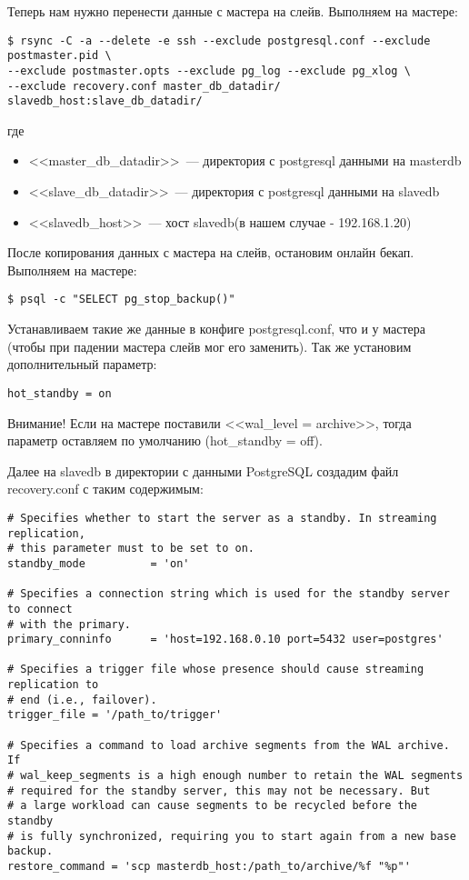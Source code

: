 Теперь нам нужно перенести данные с мастера на слейв. Выполняем на мастере:
\begin{lstlisting}[label=lst:streaming11,caption=Выполняем на мастере]
$ rsync -C -a --delete -e ssh --exclude postgresql.conf --exclude postmaster.pid \
--exclude postmaster.opts --exclude pg_log --exclude pg_xlog \
--exclude recovery.conf master_db_datadir/ slavedb_host:slave_db_datadir/
\end{lstlisting}
где
\begin{itemize}
\item <<master\_db\_datadir>>~--- директория с postgresql данными на masterdb
\item <<slave\_db\_datadir>>~--- директория с postgresql данными на slavedb
\item <<slavedb\_host>>~--- хост slavedb(в нашем случае - 192.168.1.20)
\end{itemize}

После копирования данных с мастера на слейв, остановим онлайн бекап. Выполняем на мастере:
\begin{lstlisting}[label=lst:streaming12,caption=Выполняем на мастере]
$ psql -c "SELECT pg_stop_backup()"
\end{lstlisting}

Устанавливаем такие же данные в конфиге postgresql.conf, что и у мастера (чтобы при падении мастера слейв мог его заменить).
Так же установим дополнительный параметр:
\begin{lstlisting}[label=lst:streaming13,caption=Конфиг слейва]
hot_standby = on
\end{lstlisting}
Внимание! Если на мастере поставили <<wal\_level = archive>>, тогда параметр оставляем по умолчанию (hot\_standby = off).

Далее на slavedb в директории с данными PostgreSQL создадим файл recovery.conf с таким содержимым:
\begin{lstlisting}[label=lst:streaming14,caption=Конфиг recovery.conf]
# Specifies whether to start the server as a standby. In streaming replication,
# this parameter must to be set to on.
standby_mode          = 'on'

# Specifies a connection string which is used for the standby server to connect
# with the primary.
primary_conninfo      = 'host=192.168.0.10 port=5432 user=postgres'

# Specifies a trigger file whose presence should cause streaming replication to
# end (i.e., failover).
trigger_file = '/path_to/trigger'

# Specifies a command to load archive segments from the WAL archive. If
# wal_keep_segments is a high enough number to retain the WAL segments
# required for the standby server, this may not be necessary. But
# a large workload can cause segments to be recycled before the standby
# is fully synchronized, requiring you to start again from a new base backup.
restore_command = 'scp masterdb_host:/path_to/archive/%f "%p"'
\end{lstlisting}

